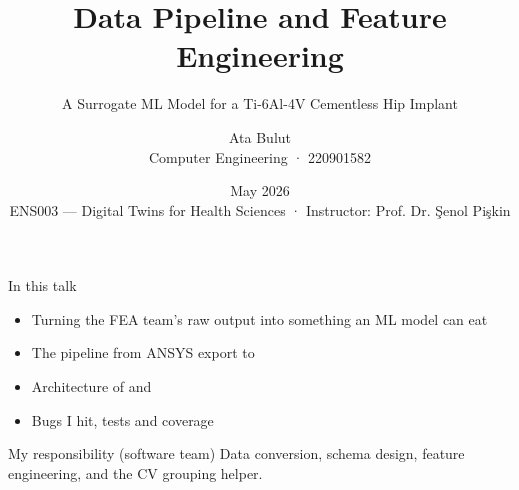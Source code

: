 

\newcommand{\courseHeader}{ENS003 --- Digital Twins for Health Sciences}
\newcommand{\courseSubheader}{Istinye University · Faculty of Engineering and Natural Sciences}
\newcommand{\instructor}{Instructor: Prof. Dr. Şenol Pişkin}
\newcommand{\projectTitle}{A Surrogate ML Model for a Ti-6Al-4V Cementless Hip Implant}

\title{Data Pipeline and Feature Engineering}
\subtitle{\projectTitle}
\author{Ata Bulut \\ \small Computer Engineering · 220901582}
\date{May 2026 \\ \scriptsize \courseHeader{} · \instructor}



\maketitle

\begin{frame}{In this talk}
  \begin{itemize}
    \item Turning the FEA team's raw output into something an ML model can eat
    \item The pipeline from ANSYS export to 
    \item Architecture of  and 
    \item Bugs I hit, tests and coverage
  \end{itemize}
  \vspace{0.4cm}
  \begin{block}{My responsibility (software team)}
    Data conversion, schema design, feature engineering,
    and the CV grouping helper.
  \end{block}
\end{frame}

